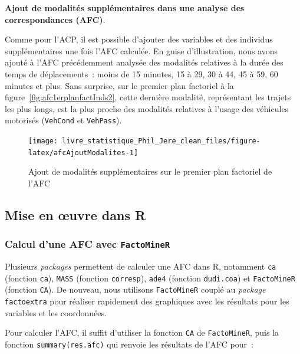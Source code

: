 \documentclass[
  11pt,
  french,
]{book}
\makeatletter
\newenvironment{kframev}{%
\medskip{}
\setlength{\fboxsep}{.8em}
 \def\at@end@of@kframev{}%
 \ifinner\ifhmode%
  \def\at@end@of@kframev{\end{minipage}}%
  \begin{minipage}{\columnwidth}%
 \fi\fi%
 \def\FrameCommand##1{\hskip\@totalleftmargin \hskip-\fboxsep
 \colorbox{shadebluecolor}{##1}\hskip-\fboxsep
     \hskip-\linewidth \hskip-\@totalleftmargin \hskip\columnwidth}%
 \MakeFramed {\advance\hsize-\width
   \@totalleftmargin\z@ \linewidth\hsize
   \@setminipage}}%
 {\par\unskip\endMakeFramed%
 \at@end@of@kframev}
\newenvironment{rmdblock}[1]
  {
  \begin{itemize}
  \renewcommand{\labelitemi}{
    \raisebox{-.7\height}[0pt][0pt]{
      {\setkeys{Gin}{width=3em,keepaspectratio}\texttt{[image: images/\#1]}}
    }
  }
  \setlength{\fboxsep}{1em}
  \begin{kframev}
  \small
  \item
  }
  {
  \end{kframev}
  \end{itemize}
  }
\newenvironment{bloc_aller_loin}
  {\begin{rmdblock}{aller_loin}}
  {\end{rmdblock}}
\makeatother
\begin{document}
\begin{bloc_aller_loin}

\textbf{Ajout de modalités supplémentaires dans une analyse des correspondances (AFC)}.

Comme pour l'ACP, il est possible d'ajouter des variables et des individus supplémentaires une fois l'AFC calculée. En guise d'illustration, nous avons ajouté à l'AFC précédemment analysée des modalités relatives à la durée des temps de déplacements~: moins de 15 minutes, 15 à 29, 30 à 44, 45 à 59, 60 minutes et plus. Sans surprise, sur le premier plan factoriel à la figure~\ref{fig:afc1erplanfactInds2}, cette dernière modalité, représentant les trajets les plus longs, est la plus proche des modalités relatives à l'usage des véhicules motorisés (\texttt{VehCond} et \texttt{VehPass}).

\begin{figure}[H]

{\centering \texttt{[image: livre\_statistique\_Phil\_Jere\_clean\_files/figure-latex/afcAjoutModalites-1]} 

}

\caption{Ajout de modalités supplémentaires sur le premier plan factoriel de l'AFC}\label{fig:afcAjoutModalites}
\end{figure}


\end{bloc_aller_loin}

\hypertarget{sect1233}{%
\subsection{Mise en œuvre dans R}\label{sect1233}}

\hypertarget{sect12331}{%
\subsubsection{\texorpdfstring{Calcul d'une AFC avec \texttt{FactoMineR}}{Calcul d'une AFC avec FactoMineR}}\label{sect12331}}

Plusieurs \emph{packages} permettent de calculer une AFC dans R, notamment \texttt{ca} (fonction \texttt{ca}), \texttt{MASS} (fonction \texttt{corresp}), \texttt{ade4} (fonction \texttt{dudi.coa}) et \texttt{FactoMineR} (fonction \texttt{CA}). De nouveau, nous utilisons \texttt{FactoMineR} couplé au \emph{package} \texttt{factoextra} pour réaliser rapidement des graphiques avec les résultats pour les variables et les coordonnées.

Pour calculer l'AFC, il suffit d'utiliser la fonction \texttt{CA} de \texttt{FactoMineR}, puis la fonction \texttt{summary(res.afc)} qui renvoie les résultats de l'AFC pour~:
\end{document}
